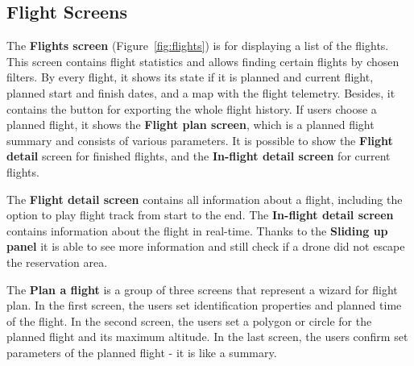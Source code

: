 \subsection{Flight Screens}\label{subsec:flight-screens}
The \textbf{Flights screen} (Figure~\ref{fig:flights}) is for displaying a list of the flights.
This screen contains flight statistics and allows finding certain flights by chosen filters.
By every flight, it shows its state if it is planned and current flight, planned start and finish dates, and a map with the flight telemetry.
Besides, it contains the button for exporting the whole flight history.
If users choose a planned flight, it shows the \textbf{Flight plan screen}, which is a planned flight summary and consists of various parameters.
It is possible to show the \textbf{Flight detail} screen for finished flights, and the \textbf{In-flight detail screen} for current flights.

The \textbf{Flight detail screen} contains all information about a flight, including the option to play flight track from start to the end.
The \textbf{In-flight detail screen} contains information about the flight in real-time.
Thanks to the \textbf{Sliding up panel} it is able to see more information and still check if a drone did not escape the reservation area.

The \textbf{Plan a flight} is a group of three screens that represent a wizard for flight plan.
In the first screen, the users set identification properties and planned time of the flight.
In the second screen, the users set a polygon or circle for the planned flight and its maximum altitude.
In the last screen, the users confirm set parameters of the planned flight - it is like a summary.


